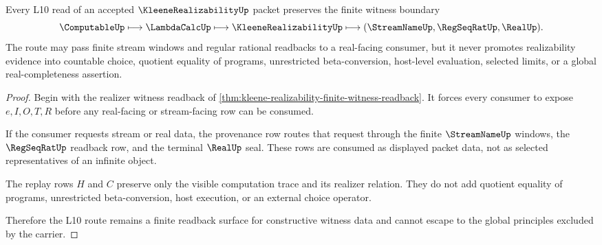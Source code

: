 \begin{theorem}
\label{thm:kleene-realizability-l10-nonescape}
Every L10 read of an accepted $\KleeneRealizabilityUp$ packet preserves the finite witness boundary
$$
\ComputableUp \longmapsto \LambdaCalcUp \longmapsto \KleeneRealizabilityUp \longmapsto (\StreamNameUp,\RegSeqRatUp,\RealUp).
$$
The route may pass finite stream windows and regular rational readbacks to a real-facing consumer, but it never promotes realizability evidence into countable choice, quotient equality of programs, unrestricted beta-conversion, host-level evaluation, selected limits, or a global real-completeness assertion.
\end{theorem}
\begin{proof}
Begin with the realizer witness readback of \autoref{thm:kleene-realizability-finite-witness-readback}. It forces every consumer to expose $e,I,O,T,R$ before any real-facing or stream-facing row can be consumed.

If the consumer requests stream or real data, the provenance row routes that request through the finite $\StreamNameUp$ windows, the $\RegSeqRatUp$ readback row, and the terminal $\RealUp$ seal. These rows are consumed as displayed packet data, not as selected representatives of an infinite object.

The replay rows $H$ and $C$ preserve only the visible computation trace and its realizer relation. They do not add quotient equality of programs, unrestricted beta-conversion, host execution, or an external choice operator.

Therefore the L10 route remains a finite readback surface for constructive witness data and cannot escape to the global principles excluded by the carrier.
\end{proof}


\begin{closurestatus}{\KleeneRealizabilityUp}
  \theoryclosure{\seedClosure}
  \formalstatus{\unformalizedV}
\end{closurestatus}
